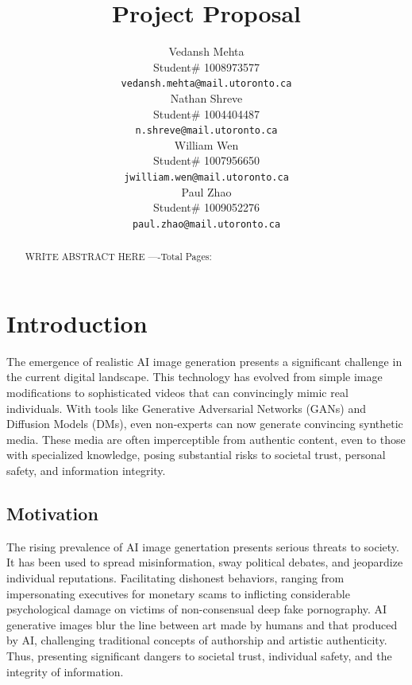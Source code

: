\documentclass{article} %
\title{Project Proposal}
\author{Vedansh Mehta  \\
Student\# 1008973577 \\
\texttt{vedansh.mehta@mail.utoronto.ca} \\
\And
Nathan Shreve  \\
Student\# 1004404487 \\
\texttt{n.shreve@mail.utoronto.ca} \\
\AND
William Wen  \\
Student\# 1007956650 \\
\texttt{jwilliam.wen@mail.utoronto.ca} \\
\And
Paul Zhao \\
Student\# 1009052276 \\
\texttt{paul.zhao@mail.utoronto.ca} \\
\AND
}
\begin{document}
\maketitle

\begin{abstract}
WRITE ABSTRACT HERE
----Total Pages: \pageref{last_page}
\end{abstract}



\section{Introduction}
\label{intro}

The emergence of realistic AI image generation presents a significant challenge in the current digital landscape. This technology has evolved from simple image modifications to sophisticated videos that can convincingly mimic real individuals. With tools like Generative Adversarial Networks (GANs) and Diffusion Models (DMs), even non-experts can now generate convincing synthetic media. These media are often imperceptible from authentic content, even to those with specialized knowledge, posing substantial risks to societal trust, personal safety, and information integrity.


\subsection{Motivation}
The rising prevalence of AI image genertation presents serious threats to society. It has been used to spread misinformation, sway political debates, and jeopardize individual reputations. Facilitating dishonest behaviors, ranging from impersonating executives for monetary scams to inflicting considerable psychological damage on victims of non-consensual deep fake pornography. AI generative images blur the line between art made by humans and that produced by AI, challenging traditional concepts of authorship and artistic authenticity. Thus, presenting significant dangers to societal trust, individual safety, and the integrity of information.
\end{document}
